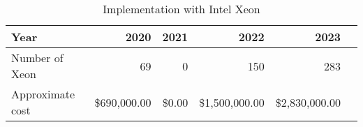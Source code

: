 \tiny \begin{longtable} { |p{}  |r  |r  |r  |r  |r |} 
\caption{Implementation with Intel Xeon \label{tab:Xeon}}\\ 
\hline 
\textbf{Year}&\textbf{2020}&\textbf{2021}&\textbf{2022}&\textbf{2023} \\ \hline
{Number of Xeon}&{69}&{0}&{150}&{283} \\ \hline
{Approximate cost}&{\$690,000.00}&{\$0.00}&{\$1,500,000.00}&{\$2,830,000.00} \\ \hline
\end{longtable} \normalsize
